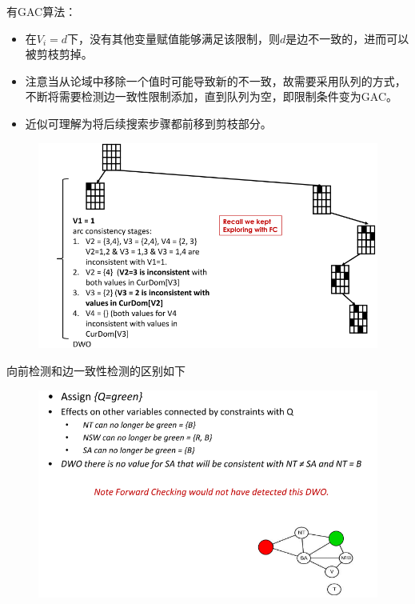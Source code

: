 有GAC算法：
\begin{itemize}
\item 在$V_i=d$下，没有其他变量赋值能够满足该限制，则$d$是边不一致的，进而可以被剪枝剪掉。
\item 注意当从论域中移除一个值时可能导致新的不一致，故需要采用队列的方式，不断将需要检测边一致性限制添加，直到队列为空，即限制条件变为GAC。
\item 近似可理解为将后续搜索步骤都前移到剪枝部分。
\end{itemize}
\begin{figure}[H]
\centering
\includegraphics[width=0.6\linewidth]{fig/gac_eg.png}
\end{figure}

向前检测和边一致性检测的区别如下
\begin{figure}[H]
\centering
\includegraphics[width=0.8\linewidth]{fig/diff_fc_gac.png}
\end{figure}